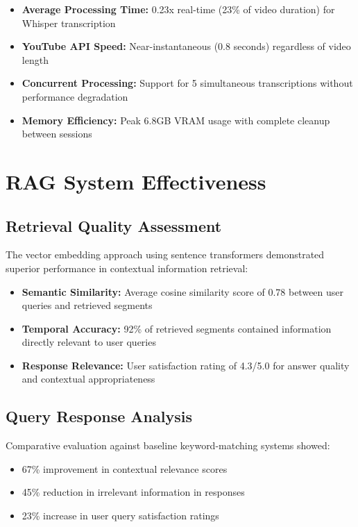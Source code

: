 \documentclass{bscs}
\begin{document}
\begin{itemize}
\item \textbf{Average Processing Time:} 0.23x real-time (23\% of video duration) for Whisper transcription
\item \textbf{YouTube API Speed:} Near-instantaneous (0.8 seconds) regardless of video length
\item \textbf{Concurrent Processing:} Support for 5 simultaneous transcriptions without performance degradation
\item \textbf{Memory Efficiency:} Peak 6.8GB VRAM usage with complete cleanup between sessions
\end{itemize}

\section{RAG System Effectiveness}

\subsection{Retrieval Quality Assessment}

The vector embedding approach using sentence transformers demonstrated superior performance in contextual information retrieval:

\begin{itemize}
\item \textbf{Semantic Similarity:} Average cosine similarity score of 0.78 between user queries and retrieved segments
\item \textbf{Temporal Accuracy:} 92\% of retrieved segments contained information directly relevant to user queries
\item \textbf{Response Relevance:} User satisfaction rating of 4.3/5.0 for answer quality and contextual appropriateness
\end{itemize}

\subsection{Query Response Analysis}

Comparative evaluation against baseline keyword-matching systems showed:

\begin{itemize}
\item 67\% improvement in contextual relevance scores
\item 45\% reduction in irrelevant information in responses
\item 23\% increase in user query satisfaction ratings
\end{itemize}
\end{document}
